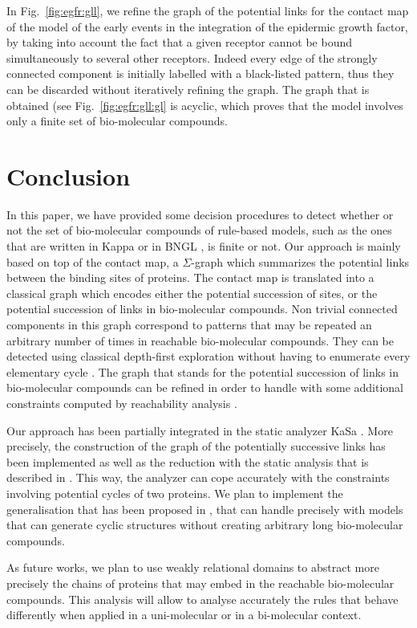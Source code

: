 \documentclass{entcs}
\begin{document}
\begin{exmp}
In Fig.~\ref{fig:egfr:gll}, we refine the graph of the potential links for the contact map of the model of the early events in the integration of the epidermic growth factor, by taking into account the fact that a given receptor cannot be bound simultaneously to several other receptors.
Indeed every edge of the strongly connected component is initially labelled with a black-listed pattern, thus they can be discarded without iteratively refining the graph. The graph that is obtained (see Fig.~\ref{fig:egfr:gll:gl} is acyclic, which proves that the model involves only a finite set of bio-molecular compounds.
\end{exmp}


\label{sec:refinement}
\section{Conclusion}

In this paper, we have provided some decision procedures
to detect whether or not the set of bio-molecular compounds of rule-based models, such as the ones that are written in Kappa \cite{DBLP:journals/tcs/DanosL04} or in BNGL \cite{BNGL}, is finite or not.
Our approach is mainly based on top of the contact map, a $\Sigma$-graph which summarizes
the potential links between the binding sites of proteins. The contact map is translated into a classical graph which encodes either the potential succession of sites, or the potential succession of links in bio-molecular compounds.
Non trivial connected components in this graph correspond to  patterns that may be repeated an arbitrary number of times in reachable bio-molecular compounds. They can be detected using classical depth-first exploration without having to enumerate every elementary cycle \cite{tarjan}.
The graph that stands for the potential succession of links in bio-molecular compounds can be refined in order to handle with some additional constraints  computed by reachability analysis \cite{DanosEtAl-VMCAI08,SASB2016,KaSa}.

Our approach has been partially integrated in the static analyzer KaSa \cite{KaSa}. More precisely, the construction of the graph of the potentially
successive links has been implemented as well as the reduction with the static analysis that is described in \cite{SASB2016}. This way, the analyzer can cope accurately with the constraints involving potential cycles of two proteins.  We plan to implement the generalisation that has been proposed in \cite{afp}, that can handle precisely with models that can generate cyclic structures without creating arbitrary long bio-molecular compounds.

As future works, we plan to use weakly relational domains \cite{DBLP:conf/sas/Mine02} to abstract more precisely the chains of proteins that may embed in the reachable bio-molecular compounds. This analysis will allow to analyse accurately the rules that behave differently when applied in a uni-molecular or in a bi-molecular context.



\end{document}
